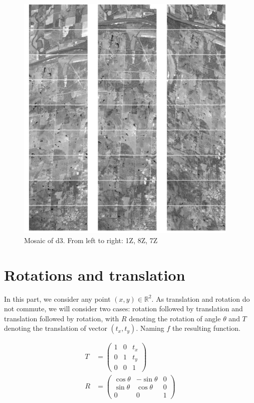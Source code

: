 \documentclass[paper=a4, fontsize=11pt, onecolumn, tikz, dvipsnames, svgnames, x11names]{article}
\begin{document}
\newpage
\begin{figure}[H]
    \centering
    \includegraphics[width = 0.95\textwidth]{d3.png}
    \caption{Mosaic of d3. From left to right: 1Z, 8Z, 7Z}
    \label{fig_mosaic_d3}
\end{figure}


\section{Rotations and translation}

In this part, we consider any point \((x, y) \in \mathbb{R}^2\). As translation and rotation do not commute, we will consider two cases: rotation followed by translation and translation followed by rotation, with \(R\) denoting the rotation of angle \(\theta\) and \(T\) denoting the translation of vector \((t_x, t_y)\). Naming \(f\) the resulting function.

\begin{align*}
    T &=
    \begin{pmatrix}
    1 & 0 & t_x \\
    0 & 1 & t_y \\
    0 & 0 & 1
    \end{pmatrix}
    \\
    R &=
    \begin{pmatrix}
    \cos \theta & -\sin \theta & 0 \\
    \sin \theta & \cos \theta & 0 \\
    0 & 0 & 1
    \end{pmatrix}
\end{align*}
\end{document}
